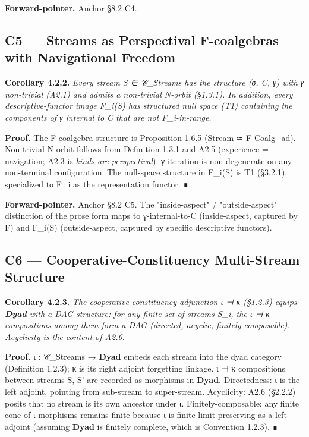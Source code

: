 \documentclass[11pt, openany]{book}
\begin{document}
\textbf{Forward-pointer.} Anchor §8.2 C4.

\subsection{C5 --- Streams as Perspectival F-coalgebras with Navigational Freedom}

\textbf{Corollary 4.2.2.} \textit{Every stream S ∈ 𝒞\_\allowbreak{}Streams has the structure (σ, C, γ) with γ non-trivial (A2.1) and admits a non-trivial N-orbit (§1.3.1). In addition, every descriptive-functor image F\_\allowbreak{}i(S) has structured null space (T1) containing the components of γ internal to C that are not F\_\allowbreak{}i-in-range.}

\textbf{Proof.} The F-coalgebra structure is Proposition 1.6.5 (Stream ≃ F-Coalg\_\allowbreak{}ad). Non-trivial N-orbit follows from Definition 1.3.1 and A2.5 (experience = navigation; A2.3 is \textit{kinds-are-perspectival}): γ-iteration is non-degenerate on any non-terminal configuration. The null-space structure in F\_\allowbreak{}i(S) is T1 (§3.2.1), specialized to F\_\allowbreak{}i as the representation functor. ∎

\textbf{Forward-pointer.} Anchor §8.2 C5. The "inside-aspect" / "outside-aspect" distinction of the prose form maps to γ-internal-to-C (inside-aspect, captured by F) and F\_\allowbreak{}i(S) (outside-aspect, captured by specific descriptive functors).

\subsection{C6 --- Cooperative-Constituency Multi-Stream Structure}

\textbf{Corollary 4.2.3.} \textit{The cooperative-constituency adjunction ι ⊣ κ (§1.2.3) equips \textbf{Dyad} with a DAG-structure: for any finite set of streams {S\_\allowbreak{}i}, the ι ⊣ κ compositions among them form a DAG (directed, acyclic, finitely-composable). Acyclicity is the content of A2.6.}

\textbf{Proof.} ι : 𝒞\_\allowbreak{}Streams → \textbf{Dyad} embeds each stream into the dyad category (Definition 1.2.3); κ is its right adjoint forgetting linkage. ι ⊣ κ compositions between streams S, S' are recorded as morphisms in \textbf{Dyad}. Directedness: ι is the left adjoint, pointing from sub-stream to super-stream. Acyclicity: A2.6 (§2.2.2) posits that no stream is its own ancestor under ι. Finitely-composable: any finite cone of ι-morphisms remains finite because ι is finite-limit-preserving as a left adjoint (assuming \textbf{Dyad} is finitely complete, which is Convention 1.2.3). ∎
\end{document}
